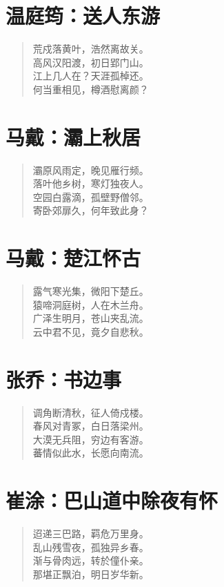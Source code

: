 \documentclass[12pt,oneside]{book}
\newenvironment{shici}{
\begin{verse}
\centering\large\hspace{12pt}}
{\end{verse}}
\begin{document}
\chapter{温庭筠：送人东游}
\begin{shici}
荒戍落黄叶，浩然离故关。\\
高风汉阳渡，初日郢门山。\\
江上几人在？天涯孤棹还。\\
何当重相见，樽酒慰离颜？
\end{shici}

\chapter{马戴：灞上秋居}
\begin{shici}
灞原风雨定，晚见雁行频。\\
落叶他乡树，寒灯独夜人。\\
空园白露滴，孤壁野僧邻。\\
寄卧郊扉久，何年致此身？
\end{shici}

\chapter{马戴：楚江怀古}
\begin{shici}
露气寒光集，微阳下楚丘。\\
猿啼洞庭树，人在木兰舟。\\
广泽生明月，苍山夹乱流。\\
云中君不见，竟夕自悲秋。
\end{shici}

\chapter{张乔：书边事}
\begin{shici}
调角断清秋，征人倚戍楼。\\
春风对青冢，白日落梁州。\\
大漠无兵阻，穷边有客游。\\
蕃情似此水，长愿向南流。
\end{shici}

\chapter{崔涂：巴山道中除夜有怀}
\begin{shici}
迢递三巴路，羁危万里身。\\
乱山残雪夜，孤独异乡春。\\
渐与骨肉远，转於僮仆亲。\\
那堪正飘泊，明日岁华新。
\end{shici}
\end{document}
